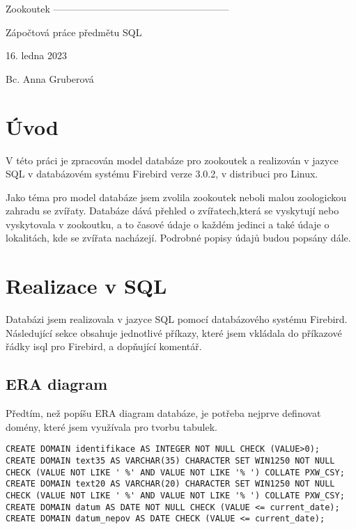 \documentclass{article}
\date{Datum: 16. 1. 2023}
\begin{document}
\begin{center}
    \vspace*{10em}
    \Huge Zookoutek
    ------------------------------------------------------

    \Large Zápočtová práce předmětu SQL

    \Large 16. ledna 2023

    \vspace*{23em}

    

    \huge Bc. Anna Gruberová

\end{center}

\newpage

\tableofcontents

\newpage

\section{Úvod}

V této práci je zpracován model databáze pro zookoutek a realizován v jazyce SQL v databázovém systému Firebird verze 3.0.2, v distribuci pro Linux.

Jako téma pro model databáze jsem zvolila zookoutek  neboli malou zoologickou zahradu  se zvířaty. Databáze dává přehled o zvířatech,která se vyskytují nebo vyskytovala v zookoutku, a to časové údaje o každém jedinci a také údaje o lokalitách, kde se zvířata nacházejí. Podrobné popisy údajů budou popsány dále.

\section{Realizace v SQL}
Databázi jsem realizovala v jazyce SQL pomocí databázového systému Firebird. Následující sekce obsahuje jednotlivé příkazy, které jsem vkládala do příkazové řádky isql pro Firebird, a dopňující komentář.

\subsection{ERA diagram}
Předtím, než popíšu ERA diagram databáze, je potřeba nejprve definovat domény, které jsem využívala pro tvorbu tabulek.

\begin{lstlisting}
CREATE DOMAIN identifikace AS INTEGER NOT NULL CHECK (VALUE>0);
CREATE DOMAIN text35 AS VARCHAR(35) CHARACTER SET WIN1250 NOT NULL CHECK (VALUE NOT LIKE ' %' AND VALUE NOT LIKE '% ') COLLATE PXW_CSY;
CREATE DOMAIN text20 AS VARCHAR(20) CHARACTER SET WIN1250 NOT NULL CHECK (VALUE NOT LIKE ' %' AND VALUE NOT LIKE '% ') COLLATE PXW_CSY;
CREATE DOMAIN datum AS DATE NOT NULL CHECK (VALUE <= current_date);
CREATE DOMAIN datum_nepov AS DATE CHECK (VALUE <= current_date);
\end{lstlisting}
\end{document}
